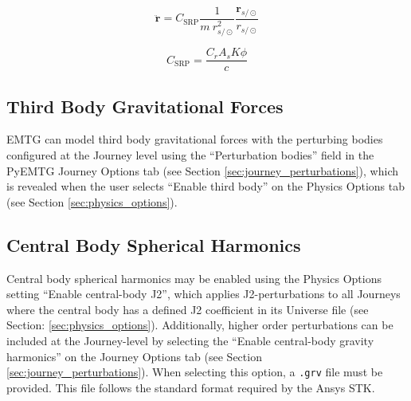             \begin{equation}
                \ddot{\mathbf{r}} = C_{\text{SRP}}\frac{1}{m ~ r_{s/\odot}^2}\frac{\mathbf{r}_{s/\odot}}{r_{s/\odot}} 
                \label{eq:EOM_SRP}
            \end{equation}
            
            \begin{equation}
                C_{\text{SRP}} = \frac{C_r A_{s} K \phi}{c} \label{eq:SRP_coeff}
            \end{equation}

        \subsection{Third Body Gravitational Forces}
        \label{sec:force_model_third_body}
        \ac{EMTG} can model third body gravitational forces with the perturbing bodies configured at the Journey level using the ``Perturbation bodies'' field in the PyEMTG Journey Options tab (see Section \ref{sec:journey_perturbations}), which is revealed when the user selects ``Enable third body'' on the Physics Options tab (see Section \ref{sec:physics_options}).

        \subsection{Central Body Spherical Harmonics}
        \label{sec:force_model_spherical_harmonics}
        Central body spherical harmonics may be enabled using the Physics Options setting ``Enable central-body J2'', which applies J2-perturbations to all Journeys where the central body has a defined J2 coefficient in its Universe file (see Section: \ref{sec:physics_options}). Additionally, higher order perturbations can be included at the Journey-level by selecting the ``Enable central-body gravity harmonics'' on the Journey Options tab (see Section \ref{sec:journey_perturbations}). When selecting this option, a {\tt .grv} file must be provided. This file follows the standard format required by the Ansys \ac{STK}.


